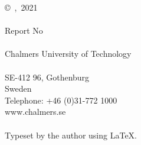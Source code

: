 %
%
%
%
%
%
%
%
%
%
%
%
%
%
%
%
%
%
%
%
%
%
%


\thispagestyle{empty}

\vspace*{9.9 cm}

\noindent\textbf{\thesistitle}\\
\ifdefined \thesissubtitle \if \thesissubtitle\empty\else
    \noindent\footnotesize{\textit{\thesissubtitle}}\\
\fi\fi\\
\normalsize
\MakeUppercase{\thesisauthor}\\
\\
\copyright~{\MakeUppercase{\thesisauthor}},~2021\\ 
\\
Report No \thesisnumber\\
\\
\noindent Chalmers University of Technology \\
\thesisdepartment \\
SE-412 96, Gothenburg\\
Sweden \\
Telephone: +46 (0)31-772 1000 \\
www.chalmers.se \\
\\
Typeset by the author using \LaTeX.\\


\clearpage

